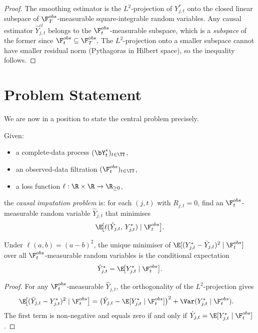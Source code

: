 \begin{proof}
The smoothing estimator is the $L^2$-projection of $Y_{j,t}^*$ onto the
closed linear subspace of $\F_T^{obs}$-measurable square-integrable random
variables.  Any causal estimator $\hat{Y}_{j,t}^{cl}$ belongs to the
$\F_t^{obs}$-measurable subspace, which is a \emph{subspace} of the former
since $\F_t^{obs}\subseteq\F_T^{obs}$.  The $L^2$-projection onto a smaller
subspace cannot have smaller residual norm (Pythagoras in Hilbert space), so
the inequality follows.
\end{proof}

\section{Problem Statement}
\label{sec:problem_statement}

We are now in a position to state the central problem precisely.

\begin{definition}
\label{def:imputation_problem}
Given:
\begin{itemize}
  \item a complete-data process $(\bY_t^*)_{t\in\TT}$,
  \item an observed-data filtration $(\F_t^{obs})_{t\in\TT}$,
  \item a loss function $\ell:\R\times\R\to\R_{\ge 0}$,
\end{itemize}
the \emph{causal imputation problem} is: for each $(j,t)$ with $R_{j,t}=0$,
find an $\F_t^{obs}$-measurable random variable $\hat{Y}_{j,t}$ that
minimises
\[
  \E\!\bigl[\ell(\hat{Y}_{j,t},\,Y_{j,t}^*)\mid\F_t^{obs}\bigr].
\]
\end{definition}

\begin{proposition}
\label{prop:oracle}
Under $\ell(a,b)=(a-b)^2$, the unique minimiser of
$\E[(Y_{j,t}^*-\hat{Y}_{j,t})^2\mid\F_t^{obs}]$ over all
$\F_t^{obs}$-measurable random variables is the conditional expectation
\[
  \hat{Y}_{j,t}^{\star} = \E\!\bigl[Y_{j,t}^*\mid\F_t^{obs}\bigr].
\]
\end{proposition}

\begin{proof}
For any $\F_t^{obs}$-measurable $\hat{Y}_{j,t}$, the orthogonality of the
$L^2$-projection gives
\begin{align*}
  \E\!\bigl[(\hat{Y}_{j,t}-Y_{j,t}^*)^2\mid\F_t^{obs}\bigr]
  &= \bigl(\hat{Y}_{j,t}-\E[Y_{j,t}^*\mid\F_t^{obs}]\bigr)^2
     +\Var(Y_{j,t}^*\mid\F_t^{obs}).
\end{align*}
The first term is non-negative and equals zero if and only if
$\hat{Y}_{j,t}=\E[Y_{j,t}^*\mid\F_t^{obs}]$.
\end{proof}

